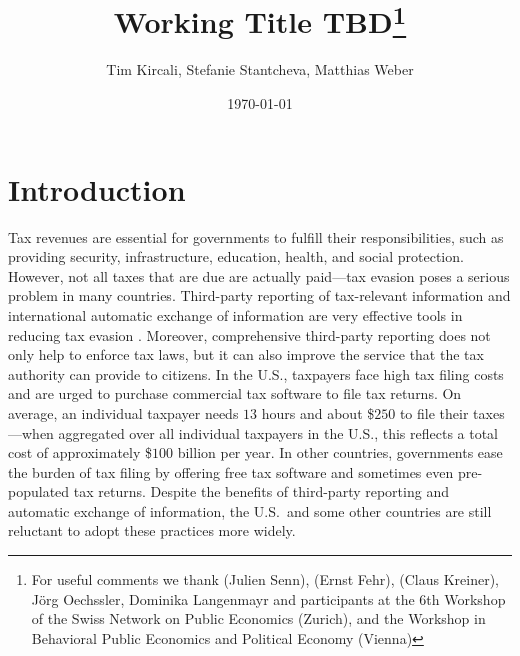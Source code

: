 \documentclass[12pt]{article}
\title{\textbf{\large{Working Title TBD\footnote{For useful comments we thank (Julien Senn), (Ernst Fehr), (Claus Kreiner), Jörg Oechssler, Dominika Langenmayr and participants at the 6th Workshop of the Swiss Network on Public Economics (Zurich), and the Workshop in Behavioral Public Economics and Political Economy (Vienna) }}}}
\author{\normalsize{Tim Kircali, Stefanie Stantcheva, Matthias Weber}}
\date{\normalsize{\today}}
\begin{document}
\maketitle
{}


\section{Introduction}
Tax revenues are essential for governments to fulfill their responsibilities, such as providing security, infrastructure, education, health, and social protection. However, not all taxes that are due are actually paid---tax evasion poses a serious problem in many countries. Third-party reporting of tax-relevant information and international automatic exchange of information are very effective tools in reducing tax evasion \parencite{kleven2011unwilling, pomeranz2015no, slemrod2017does, boas2024taxing}. Moreover, comprehensive third-party reporting does not only help to enforce tax laws, but it can also improve the service that the tax authority can provide to citizens. In the U.S., taxpayers face high tax filing costs and are urged to purchase commercial tax software to file tax returns. On average, an individual taxpayer needs $13$ hours and about \$$250$ to file their taxes \parencite[][]{IRS2022}---when aggregated over all individual taxpayers in the U.S., this reflects a total cost of approximately \$$100$ billion per year. %
In other countries, governments ease the burden of tax filing by offering free tax software and sometimes even pre-populated tax returns. Despite the benefits of third-party reporting and automatic exchange of information, the U.S.\ and some other countries are still reluctant to adopt these practices more widely.
\end{document}
